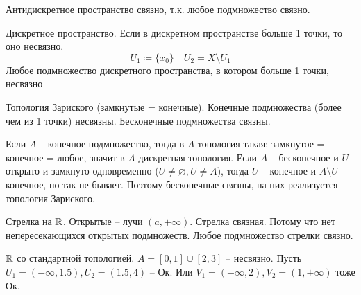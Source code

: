 \documentclass[main]{subfiles}
\begin{document}
\begin{example}
    Антидискретное пространство связно, т.к. любое подмножество связно.
\end{example}
\begin{example}
    Дискретное пространство.
    Если в дискретном пространстве больше 1 точки, то оно несвязно.
    \[U_1 \coloneqq\{x_0\} \quad U_2 = X \setminus U_1\]
    Любое подмножество дискретного пространства, в котором больше 1 точки, несвязно
\end{example}
\begin{example}
    Топология Зариского (замкнутые = конечные).
    Конечные подмножества (более чем из 1 точки) несвязны.
    Бесконечные подмножества связны.

    Если $A$ -- конечное подмножество, тогда в $A$ топология такая: замкнутое = конечное = любое, значит в $A$ дискретная топология.
    Если $A$ -- бесконечное и $U$ открыто и замкнуто одновременно ($U \neq \varnothing, U \neq A$), тогда $U$ -- конечное и $A \setminus U$ -- конечное, но так не бывает.
    Поэтому бесконечные связны, на них реализуется топология Зариского.
\end{example}
\begin{example}
    Стрелка на $\mathbb{R}$. Открытые -- лучи $(a, + \infty)$. Стрелка связная.
    Потому что нет непересекающихся открытых подмножеств.
    Любое подмножество стрелки связно.
\end{example}
\begin{example}
    $\mathbb{R}$ со стандартной топологией.
    $A = [0,1] \cup [2,3]$ -- несвязно.
    Пусть $U_1 = (-\infty, 1.5), U_2 = (1.5, 4)$ -- Ок.
    Или $V_1 = (-\infty,2), V_2 = (1, +\infty)$ тоже Ок.
\end{example}
\end{document}
